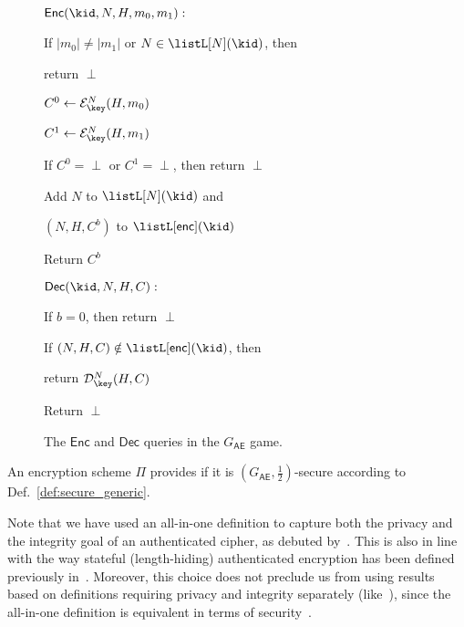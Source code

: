 \begin{figure}

\begin{minipage}[t]{.49\textwidth}
\baselineskip=15pt

\underline{$\mathsf{Enc}(\kid, N, H, m_0, m_1):$}
\smallskip

If $|m_0| \neq |m_1|$ or $N \in \listL[N](\kid)$, then 

\hspace*{2em} return $\perp$


$C^0 \gets \mathcal{E}_\key^N(H, m_0)$

$C^1 \gets \mathcal{E}_\key^N(H, m_1)$

If $C^0 = \perp$ or $C^1 = \perp$, then return $\perp$

Add $N$ to $\listL[N](\kid)$ and 

$(N, H, C^b)$ to $\listL[\mathsf{enc}](\kid)$ 

Return $C^b$
\end{minipage} 
 \vrule \hfill
\begin{minipage}[t]{.46\textwidth}
\baselineskip=15pt

\underline{$\mathsf{Dec}(\kid, N, H, C):$}
\smallskip

If $b = 0$, then return $\perp$


If $(N,H,C) \notin \listL[\mathsf{enc}](\kid)$, then 

\hspace*{2em} return $\mathcal{D}_\key^N(H, C)$

Return $\perp$
\end{minipage}

\caption{The $\mathsf{Enc}$ and $\mathsf{Dec}$ queries in the $G_\mathsf{AE}$ game.}
\label{fig:authenticated_encryption_definition}
\end{figure}

\begin{definition}
An encryption scheme $\Pi$ provides  if it is 
$(G_\mathsf{AE}, \frac{1}{2})$-secure according to Def.~\ref{def:secure_generic}.
\end{definition}

Note that we have used an all-in-one definition to capture both the privacy and the integrity goal of an authenticated cipher, 
as debuted by~\cite{RogawayS:2006:key_wrap_problem}.
This is also in line with the way stateful (length-hiding) authenticated encryption has been defined previously in~\cite{JagerKSS:2012:TLS--DHE_standard_model}.
Moreover, this choice does not preclude us from using results based on definitions requiring privacy and integrity separately (like~\cite{Jonsson:2002:CCM-IND-CCA}),
since the all-in-one definition is equivalent in terms of security~\cite[Appx.~B]{RogawayS:2006:deterministicAE_key_wrap}.   
